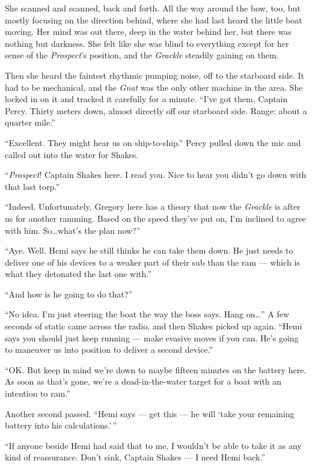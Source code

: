 \documentclass[
]{scrbook}
\begin{document}
She scanned and scanned, back and forth. All the way around the bow,
too, but mostly focusing on the direction behind, where she had last
heard the little boat moving. Her mind was out there, deep in the water
behind her, but there was nothing but darkness. She felt like she was
blind to everything except for her sense of the \emph{Prospect}'s
position, and the \emph{Grackle} steadily gaining on them.

Then she heard the faintest rhythmic pumping noise, off to the starboard
side. It had to be mechanical, and the \emph{Gnat} was the only other
machine in the area. She locked in on it and tracked it carefully for a
minute. ``I've got them, Captain Percy. Thirty meters down, almost
directly off our starboard side. Range: about a quarter mile.''

``Excellent. They might hear us on ship-to-ship.'' Percy pulled down the
mic and called out into the water for Shakes.

``\emph{Prospect}! Captain Shakes here. I read you. Nice to hear you
didn't go down with that last torp.''

``Indeed. Unfortunately, Gregory here has a theory that now the
\emph{Grackle} is after us for another ramming. Based on the speed
they've put on, I'm inclined to agree with him. So\ldots what's the plan
now?''

``Aye. Well, Hemi says he still thinks he can take them down. He just
needs to deliver one of his devices to a weaker part of their sub than
the ram --- which is what they detonated the last one with.''

``And how is he going to do that?''

``No idea. I'm just steering the boat the way the boss says. Hang
on\ldots{}'' A few seconds of static came across the radio, and then
Shakes picked up again. ``Hemi says you should just keep running ---
make evasive moves if you can. He's going to maneuver us into position
to deliver a second device.''

``OK. But keep in mind we're down to maybe fifteen minutes on the
battery here. As soon as that's gone, we're a dead-in-the-water target
for a boat with an intention to ram.''

Another second passed. ``Hemi says --- get this --- he will `take your
remaining battery into his calculations.'\,''

``If anyone beside Hemi had said that to me, I wouldn't be able to take
it as any kind of reassurance. Don't sink, Captain Shakes --- I need
Hemi back.''
\end{document}
